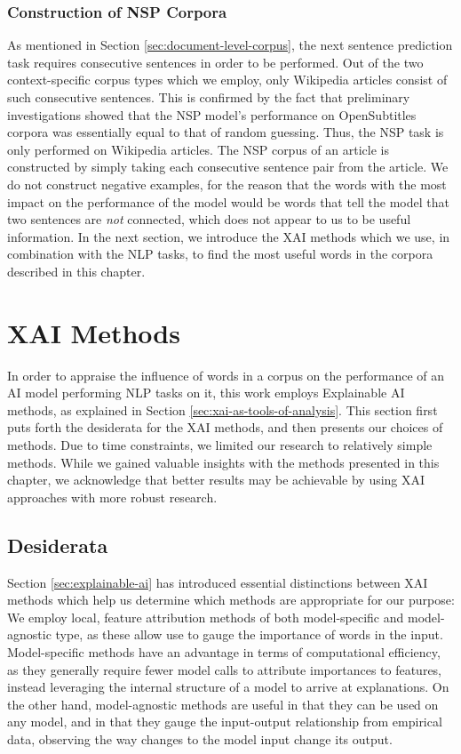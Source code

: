\subsubsection{Construction of NSP Corpora}
As mentioned in Section \ref{sec:document-level-corpus}, the next sentence prediction task requires consecutive sentences in order to be performed.
Out of the two context-specific corpus types which we employ, only Wikipedia articles consist of such consecutive sentences.
This is confirmed by the fact that preliminary investigations showed that the NSP model's performance on OpenSubtitles corpora was essentially equal to that of random guessing.
Thus, the NSP task is only performed on Wikipedia articles.
The NSP corpus of an article is constructed by simply taking each consecutive sentence pair from the article.
We do not construct negative examples, for the reason that the words with the most impact on the performance of the model would be words that tell the model that two sentences are \textit{not} connected, which does not appear to us to be useful information.
In the next section, we introduce the XAI methods which we use, in combination with the NLP tasks, to find the most useful words in the corpora described in this chapter.

\section{XAI Methods} \label{sec:xai-methods}
In order to appraise the influence of words in a corpus on the performance of an AI model performing NLP tasks on it, this work employs Explainable AI methods, as explained in Section \ref{sec:xai-as-tools-of-analysis}.
This section first puts forth the desiderata for the XAI methods, and then presents our choices of methods.
Due to time constraints, we limited our research to relatively simple methods.
While we gained valuable insights with the methods presented in this chapter, we acknowledge that better results may be achievable by using XAI approaches with more robust research.

\subsection{Desiderata}
Section \ref{sec:explainable-ai} has introduced essential distinctions between XAI methods which help us determine which methods are appropriate for our purpose:
We employ local, feature attribution methods of both model-specific and model-agnostic type, as these allow use to gauge the importance of words in the input.
Model-specific methods have an advantage in terms of computational efficiency, as they generally require fewer model calls to attribute importances to features, instead leveraging the internal structure of a model to arrive at explanations.
On the other hand, model-agnostic methods are useful in that they can be used on any model, and in that they gauge the input-output relationship from empirical data, observing the way changes to the model input change its output.

